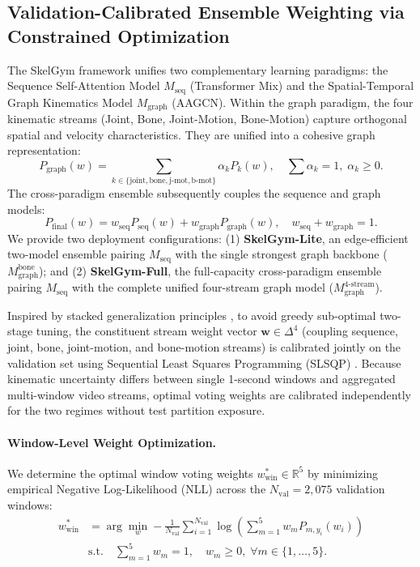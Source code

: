 \documentclass[preprint,12pt]{elsarticle}
\begin{document}
\subsection{Validation-Calibrated Ensemble Weighting via Constrained Optimization}
The SkelGym framework unifies two complementary learning paradigms: the Sequence Self-Attention Model $M_{\text{seq}}$ (Transformer Mix) and the Spatial-Temporal Graph Kinematics Model $M_{\text{graph}}$ (AAGCN). Within the graph paradigm, the four kinematic streams (Joint, Bone, Joint-Motion, Bone-Motion) capture orthogonal spatial and velocity characteristics. They are unified into a cohesive graph representation:
\begin{equation}
    P_{\text{graph}}(w) = \sum_{k \in \{\text{joint}, \text{bone}, \text{j-mot}, \text{b-mot}\}} \alpha_k P_k(w), \quad \sum \alpha_k = 1, \; \alpha_k \ge 0.
\end{equation}
The cross-paradigm ensemble subsequently couples the sequence and graph models:
\begin{equation}
    P_{\text{final}}(w) = w_{\text{seq}} P_{\text{seq}}(w) + w_{\text{graph}} P_{\text{graph}}(w), \quad w_{\text{seq}} + w_{\text{graph}} = 1.
\end{equation}
We provide two deployment configurations: (1) \textbf{SkelGym-Lite}, an edge-efficient two-model ensemble pairing $M_{\text{seq}}$ with the single strongest graph backbone ($M_{\text{graph}}^{\text{bone}}$); and (2) \textbf{SkelGym-Full}, the full-capacity cross-paradigm ensemble pairing $M_{\text{seq}}$ with the complete unified four-stream graph model ($M_{\text{graph}}^{\text{4-stream}}$).

Inspired by stacked generalization principles \cite{wolpert1992stacking}, to avoid greedy sub-optimal two-stage tuning, the constituent stream weight vector $\mathbf{w} \in \Delta^4$ (coupling sequence, joint, bone, joint-motion, and bone-motion streams) is calibrated jointly on the validation set using Sequential Least Squares Programming (SLSQP) \cite{kraft1988,virtanen2020}. Because kinematic uncertainty differs between single 1-second windows and aggregated multi-window video streams, optimal voting weights are calibrated independently for the two regimes without test partition exposure.

\paragraph{Window-Level Weight Optimization.} We determine the optimal window voting weights $w_{\text{win}}^* \in \mathbb{R}^5$ by minimizing empirical Negative Log-Likelihood (NLL) across the $N_{\text{val}} = 2,075$ validation windows:
\begin{align}
\label{eq:ensemble_opt}
    w_{\text{win}}^* &= \arg\min_{w} -\frac{1}{N_{\text{val}}} \sum_{i=1}^{N_{\text{val}}} \log \left( \sum_{m=1}^5 w_m P_{m, y_i}(w_i) \right) \\
\label{eq:simplex}
    &\text{s.t.} \quad \sum_{m=1}^5 w_m = 1, \quad w_m \ge 0, \; \forall m \in \{1, \dots, 5\}.
\end{align}
\end{document}
